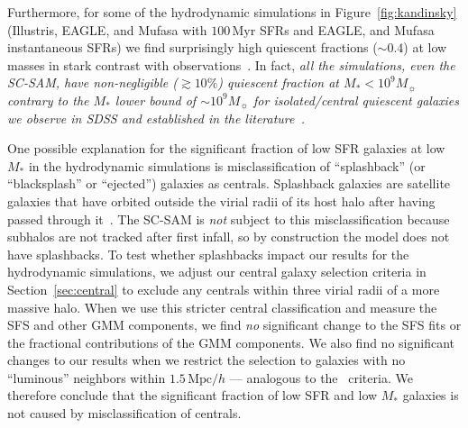 \documentclass[tighten, preprint]{aastex62}
\begin{document}
Furthermore, for some of the hydrodynamic simulations in 
Figure~\ref{fig:kandinsky} (Illustris, EAGLE, and {\sc Mufasa} with 
$100\,\mathrm{Myr}$ SFRs and EAGLE, and {\sc Mufasa} instantaneous SFRs)
we find surprisingly high quiescent fractions (${\sim}0.4$) at low masses in stark 
contrast with observations~\citep{baldry2006,peng2010,hahn2015}. In fact, 
\emph{all the simulations, even the SC-SAM, have non-negligible (${\gtrsim}10\%$) 
quiescent fraction at $M_*{<}10^9 M_\sun$ contrary to the $M_*$ lower bound of 
${\sim}10^9M_\sun$ for isolated/central quiescent galaxies 
we observe in SDSS and established in the literature~\citep[\emph{e.g.}][]{geha2012}.}

One possible explanation for the significant fraction of low SFR galaxies
at low $M_*$ in the hydrodynamic simulations is misclassification of 
``splashback'' (or ``blacksplash'' or ``ejected'') galaxies as centrals. 
Splashback galaxies are satellite galaxies that have orbited outside 
the virial radii of its host halo after having passed through 
it~\citep[\emph{e.g.}][]{mamon2004,gill2005,wang2009a,wetzel2014}.
The SC-SAM is {\em not} subject to this misclassification because subhalos 
are not tracked after first infall, so by construction the 
model does not have splashbacks. To test whether splashbacks 
impact our results for the hydrodynamic simulations, we adjust our central
galaxy selection criteria in Section~\ref{sec:central} to exclude 
any centrals within three virial radii of a more massive halo.
When we use this stricter central classification and measure the
SFS and other GMM components, we find \emph{no} significant change to 
the SFS fits or the fractional contributions of the GMM components. 
We also find no significant changes to our results when we restrict 
the selection to galaxies with no ``luminous'' neighbors within 
$1.5\,\mathrm{Mpc}/h$ --- analogous to the~\cite{geha2012} criteria.
We therefore conclude that the significant fraction of low SFR and 
low $M_*$ galaxies is not caused by misclassification of centrals.
\end{document}
